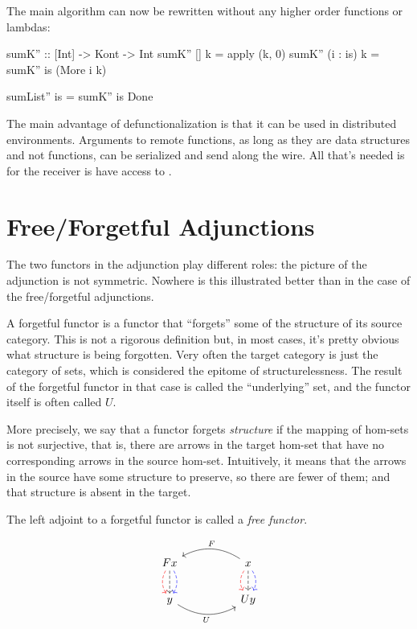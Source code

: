 \documentclass[DaoFP]{subfiles}
\begin{document}
The main algorithm can now be rewritten without any higher order functions or lambdas:
\begin{haskell}
sumK'' :: [Int] -> Kont -> Int
sumK'' [] k = apply (k, 0)
sumK'' (i : is) k = sumK'' is (More i k)
\end{haskell}

\begin{haskell}
sumList'' is = sumK'' is Done
\end{haskell}

The main advantage of defunctionalization is that it can be used in distributed environments. Arguments to remote functions, as long as they are data structures and not functions, can be serialized and send along the wire. All that's needed is for the receiver is have access to . 

\section{Free/Forgetful Adjunctions}
The two functors in the adjunction play different roles: the picture of the adjunction is not symmetric. Nowhere is this illustrated better than in the case of the free/forgetful adjunctions. 

A forgetful functor is a functor that ``forgets'' some of the structure of its source category. This is not a rigorous definition but, in most cases, it's pretty obvious what structure is being forgotten. Very often the target category is just the category of sets, which is considered the epitome of structurelessness. The result of the forgetful functor in that case is called the ``underlying'' set, and the functor itself is often called $U$. 

More precisely, we say that a functor forgets \emph{structure} if the mapping of hom-sets is not surjective, that is, there are arrows in the target hom-set that have no corresponding arrows in the source hom-set. Intuitively, it means that the arrows in the source have some structure to preserve, so there are fewer of them; and that structure is absent in the target. 

The left adjoint to a forgetful functor is called a \emph{free functor}.

\[
 \begin{tikzcd}
F x
\arrow[d, bend right, red, dashed]
\arrow[d, dashed]
\arrow[d, bend left, blue, dashed]
  &&
  x
\arrow[d, bend right, red, dashed]
\arrow[d, dashed]
\arrow[d, bend left, blue, dashed]
 \arrow[ll, bend right, "F"']
 \\
y
   \arrow[rr, bend right, "U"']
 &&
 U y
  \end{tikzcd}
\]
\end{document}
